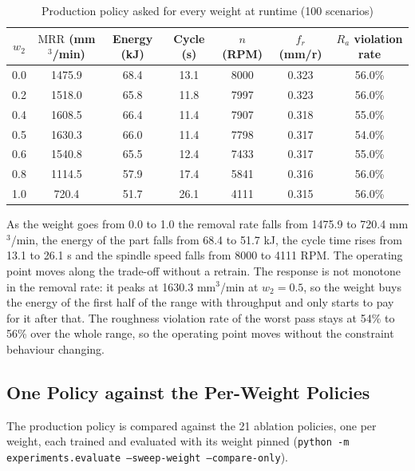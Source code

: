 \documentclass[11pt,a4paper]{article}
\newcommand{\MRR}{\mathrm{MRR}}
\newcommand{\Ra}{R_a}
\begin{document}
\begin{table}[H]
\centering
\caption{Production policy asked for every weight at runtime (100 scenarios)}
\label{tab:weightsweep}
\begin{tabular}{@{}ccccccc@{}}
\toprule
$w_2$ & $\MRR$ (mm$^3$/min) & Energy (kJ) & Cycle (s) & $n$ (RPM) & $f_r$ (mm/r) & $\Ra$ violation rate \\
\midrule
0.0 & 1475.9 & 68.4 & 13.1 & 8000 & 0.323 & 56.0\% \\
0.2 & 1518.0 & 65.8 & 11.8 & 7997 & 0.323 & 56.0\% \\
0.4 & 1608.5 & 66.4 & 11.4 & 7907 & 0.318 & 55.0\% \\
0.5 & 1630.3 & 66.0 & 11.4 & 7798 & 0.317 & 54.0\% \\
0.6 & 1540.8 & 65.5 & 12.4 & 7433 & 0.317 & 55.0\% \\
0.8 & 1114.5 & 57.9 & 17.4 & 5841 & 0.316 & 56.0\% \\
1.0 & 720.4 & 51.7 & 26.1 & 4111 & 0.315 & 56.0\% \\
\bottomrule
\end{tabular}
\end{table}

As the weight goes from 0.0 to 1.0 the removal rate falls from 1475.9 to 720.4 mm$^3$/min, the energy of the part falls from 68.4 to 51.7 kJ, the cycle time rises from 13.1 to 26.1 s and the spindle speed falls from 8000 to 4111 RPM. The operating point moves along the trade-off without a retrain. The response is not monotone in the removal rate: it peaks at 1630.3 mm$^3$/min at $w_2 = 0.5$, so the weight buys the energy of the first half of the range with throughput and only starts to pay for it after that. The roughness violation rate of the worst pass stays at 54\% to 56\% over the whole range, so the operating point moves without the constraint behaviour changing.

\subsection{One Policy against the Per-Weight Policies}
\label{sec:conditioned}

The production policy is compared against the 21 ablation policies, one per weight, each trained and evaluated with its weight pinned (\texttt{python -m experiments.evaluate --sweep-weight --compare-only}).
\end{document}
